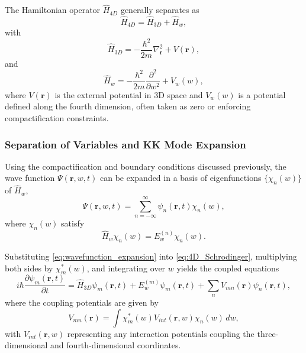 \documentclass[12pt]{article}
\begin{document}
The Hamiltonian operator \(\hat{H}_{4D}\) generally separates as
\begin{equation}
    \hat{H}_{4D} = \hat{H}_{3D} + \hat{H}_w,
    \label{eq:hamiltonian_separation}
\end{equation}
with
\begin{equation}
    \hat{H}_{3D} = -\frac{\hbar^2}{2m} \nabla_{\mathbf{r}}^2 + V(\mathbf{r}),
\end{equation}
and
\begin{equation}
    \hat{H}_w = -\frac{\hbar^2}{2m} \frac{\partial^2}{\partial w^2} + V_w(w),
\end{equation}
where \(V(\mathbf{r})\) is the external potential in 3D space and \(V_w(w)\) is a potential defined along the fourth dimension, often taken as zero or enforcing compactification constraints.

\subsubsection*{Separation of Variables and KK Mode Expansion}

Using the compactification and boundary conditions discussed previously, the wave function \(\Psi(\mathbf{r}, w, t)\) can be expanded in a basis of eigenfunctions \(\{\chi_n(w)\}\) of \(\hat{H}_w\),
\begin{equation}
    \Psi(\mathbf{r}, w, t) = \sum_{n=-\infty}^\infty \psi_n(\mathbf{r}, t) \chi_n(w),
    \label{eq:wavefunction_expansion}
\end{equation}
where \(\chi_n(w)\) satisfy
\begin{equation}
    \hat{H}_w \chi_n(w) = E_w^{(n)} \chi_n(w).
\end{equation}

Substituting \eqref{eq:wavefunction_expansion} into \eqref{eq:4D_Schrodinger}, multiplying both sides by \(\chi_m^*(w)\), and integrating over \(w\) yields the coupled equations
\begin{equation}
    i \hbar \frac{\partial \psi_m(\mathbf{r}, t)}{\partial t} = \hat{H}_{3D} \psi_m(\mathbf{r}, t) + E_w^{(m)} \psi_m(\mathbf{r}, t) + \sum_{n} V_{mn}(\mathbf{r}) \psi_n(\mathbf{r}, t),
    \label{eq:coupled_modes}
\end{equation}
where the coupling potentials are given by
\begin{equation}
    V_{mn}(\mathbf{r}) = \int \chi_m^*(w) V_{int}(\mathbf{r}, w) \chi_n(w) \, dw,
\end{equation}
with \(V_{int}(\mathbf{r}, w)\) representing any interaction potentials coupling the three-dimensional and fourth-dimensional coordinates.
\end{document}

